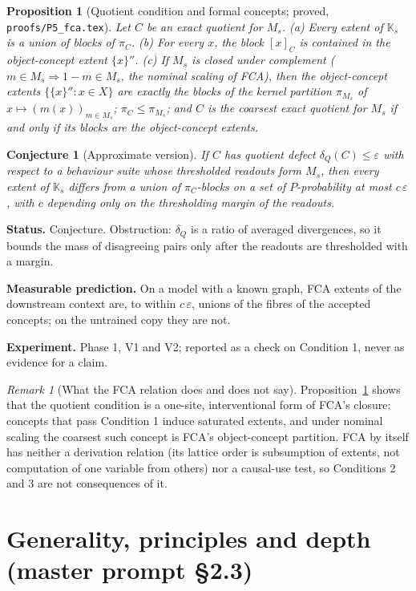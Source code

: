 \documentclass[11pt]{article}
\theoremstyle{definition}
\theoremstyle{plain}
\newtheorem{proposition}[definition]{Proposition}
\newtheorem{conjecture}[definition]{Conjecture}
\theoremstyle{remark}
\newtheorem{remark}[definition]{Remark}
\newcommand{\Part}{\pi}
\newcommand{\status}[1]{\par\noindent\textbf{Status.} #1}
\newcommand{\predict}[1]{\par\noindent\textbf{Measurable prediction.} #1}
\newcommand{\experiment}[1]{\par\noindent\textbf{Experiment.} #1\par\medskip}
\begin{document}
\begin{proposition}[Quotient condition and formal concepts; proved,
\texttt{proofs/P5\_fca.tex}]\label{prop:fca}
Let $C$ be an exact quotient for $M_s$.
(a) Every extent of $\mathbb{K}_s$ is a union of blocks of $\Part_C$.
(b) For every $x$, the block $[x]_C$ is contained in the object-concept extent
$\{x\}''$.
(c) If $M_s$ is closed under complement ($m\in M_s\Rightarrow 1-m\in M_s$,
the nominal scaling of FCA), then the object-concept extents
$\{\{x\}'':x\in X\}$ are exactly the blocks of the kernel partition
$\Part_{M_s}$ of $x\mapsto(m(x))_{m\in M_s}$; $\Part_C\le\Part_{M_s}$; and $C$
is the coarsest exact quotient for $M_s$ if and only if its blocks are the
object-concept extents.
\end{proposition}

\begin{conjecture}[Approximate version]\label{conj:fca}
If $C$ has quotient defect $\delta_Q(C)\le\varepsilon$ with respect to a
behaviour suite whose thresholded readouts form $M_s$, then every extent of
$\mathbb{K}_s$ differs from a union of $\Part_C$-blocks on a set of
$P$-probability at most $c\,\varepsilon$, with $c$ depending only on the
thresholding margin of the readouts.
\end{conjecture}
\status{Conjecture. Obstruction: $\delta_Q$ is a ratio of averaged
divergences, so it bounds the mass of disagreeing pairs only after the
readouts are thresholded with a margin.}
\predict{On a model with a known graph, FCA extents of the downstream context
are, to within $c\,\varepsilon$, unions of the fibres of the accepted
concepts; on the untrained copy they are not.}
\experiment{Phase 1, V1 and V2; reported as a check on Condition 1, never as
evidence for a claim.}

\begin{remark}[What the FCA relation does and does not say]
Proposition~\ref{prop:fca} shows that the quotient condition is a one-site, interventional
form of FCA's closure: concepts that pass Condition 1 induce saturated extents,
and under nominal scaling the coarsest such concept is FCA's object-concept
partition. FCA by itself has neither a derivation relation (its lattice order
is subsumption of extents, not computation of one variable from others) nor a
causal-use test, so Conditions 2 and 3 are not consequences of it.
\end{remark}

\section{Generality, principles and depth (master prompt \S2.3)}
\label{sec:gen}
\end{document}
